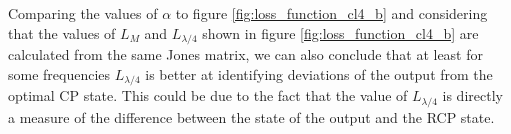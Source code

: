 Comparing the values of $\alpha$ to figure \ref{fig:loss_function_cl4_b} and considering that the values of $L_M$ and $L_{\lambda/4}$ shown in figure \ref{fig:loss_function_cl4_b} are calculated from the same Jones matrix, we can also conclude that at least for some frequencies $L_{\lambda/4}$ is better at identifying deviations of the output from the optimal CP state. This could be due to the fact that the value of $L_{\lambda/4}$ is directly a measure of the difference between the state of the output and the RCP state.


